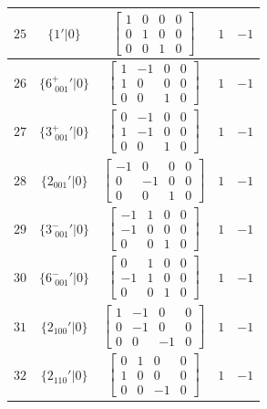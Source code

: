 \documentclass[fleqn,8pt]{jsarticle}
\begin{document}
\begin{longtable}{ccccc}
$ 25 $ & $ \{1{}'|0\} $ & $ \begin{bmatrix} 1 & 0 & 0 & 0 \\ 0 & 1 & 0 & 0 \\ 0 & 0 & 1 & 0 \end{bmatrix} $ & $ 1 $ & $ -1 $ \\ \hline
$ 26 $ & $ \{6^{+}_{\,\,001}{}'|0\} $ & $ \begin{bmatrix} 1 & -1 & 0 & 0 \\ 1 & 0 & 0 & 0 \\ 0 & 0 & 1 & 0 \end{bmatrix} $ & $ 1 $ & $ -1 $ \\ \hline
$ 27 $ & $ \{3^{+}_{\,\,001}{}'|0\} $ & $ \begin{bmatrix} 0 & -1 & 0 & 0 \\ 1 & -1 & 0 & 0 \\ 0 & 0 & 1 & 0 \end{bmatrix} $ & $ 1 $ & $ -1 $ \\ \hline
$ 28 $ & $ \{2{}_{001}{}'|0\} $ & $ \begin{bmatrix} -1 & 0 & 0 & 0 \\ 0 & -1 & 0 & 0 \\ 0 & 0 & 1 & 0 \end{bmatrix} $ & $ 1 $ & $ -1 $ \\ \hline
$ 29 $ & $ \{3^{-}_{\,\,001}{}'|0\} $ & $ \begin{bmatrix} -1 & 1 & 0 & 0 \\ -1 & 0 & 0 & 0 \\ 0 & 0 & 1 & 0 \end{bmatrix} $ & $ 1 $ & $ -1 $ \\ \hline
$ 30 $ & $ \{6^{-}_{\,\,001}{}'|0\} $ & $ \begin{bmatrix} 0 & 1 & 0 & 0 \\ -1 & 1 & 0 & 0 \\ 0 & 0 & 1 & 0 \end{bmatrix} $ & $ 1 $ & $ -1 $ \\ \hline
$ 31 $ & $ \{2{}_{100}{}'|0\} $ & $ \begin{bmatrix} 1 & -1 & 0 & 0 \\ 0 & -1 & 0 & 0 \\ 0 & 0 & -1 & 0 \end{bmatrix} $ & $ 1 $ & $ -1 $ \\ \hline
$ 32 $ & $ \{2{}_{110}{}'|0\} $ & $ \begin{bmatrix} 0 & 1 & 0 & 0 \\ 1 & 0 & 0 & 0 \\ 0 & 0 & -1 & 0 \end{bmatrix} $ & $ 1 $ & $ -1 $ \\ \hline

\end{longtable}
\end{document}
